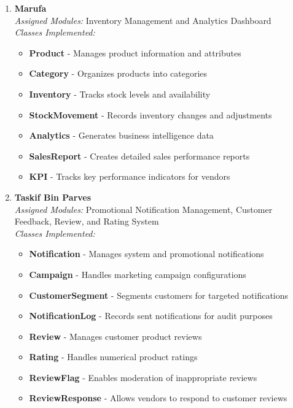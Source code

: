 \begin{enumerate}
\item \textbf{Marufa} \\
\textit{Assigned Modules:} Inventory Management and Analytics Dashboard \\
\textit{Classes Implemented:}
\begin{itemize}
    \item \textbf{Product} - Manages product information and attributes
    \item \textbf{Category} - Organizes products into categories
    \item \textbf{Inventory} - Tracks stock levels and availability
    \item \textbf{StockMovement} - Records inventory changes and adjustments
    \item \textbf{Analytics} - Generates business intelligence data
    \item \textbf{SalesReport} - Creates detailed sales performance reports
    \item \textbf{KPI} - Tracks key performance indicators for vendors
\end{itemize}

\item \textbf{Taskif Bin Parves} \\
\textit{Assigned Modules:} Promotional Notification Management, Customer Feedback, Review, and Rating System \\
\textit{Classes Implemented:}
\begin{itemize}
    \item \textbf{Notification} - Manages system and promotional notifications
    \item \textbf{Campaign} - Handles marketing campaign configurations
    \item \textbf{CustomerSegment} - Segments customers for targeted notifications
    \item \textbf{NotificationLog} - Records sent notifications for audit purposes
    \item \textbf{Review} - Manages customer product reviews
    \item \textbf{Rating} - Handles numerical product ratings
    \item \textbf{ReviewFlag} - Enables moderation of inappropriate reviews
    \item \textbf{ReviewResponse} - Allows vendors to respond to customer reviews
\end{itemize}

\end{enumerate}

